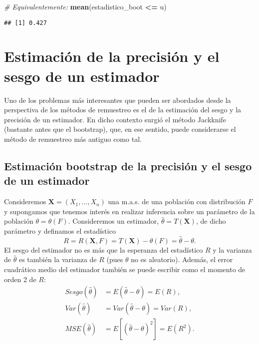 \documentclass[]{book}
\newenvironment{Shaded}{\begin{snugshade}}{\end{snugshade}}
\newcommand{\KeywordTok}[1]{\textcolor[rgb]{0.13,0.29,0.53}{\textbf{#1}}}
\newcommand{\StringTok}[1]{\textcolor[rgb]{0.31,0.60,0.02}{#1}}
\newcommand{\CommentTok}[1]{\textcolor[rgb]{0.56,0.35,0.01}{\textit{#1}}}
\newcommand{\OperatorTok}[1]{\textcolor[rgb]{0.81,0.36,0.00}{\textbf{#1}}}
\newcommand{\NormalTok}[1]{#1}
\theoremstyle{break}
\theoremstyle{definition}
\theoremstyle{definition}
\theoremstyle{definition}
\theoremstyle{remark}
\begin{document}
\begin{Shaded}
\begin{Highlighting}[]
\CommentTok{# Equivalentemente:}
\KeywordTok{mean}\NormalTok{(estadistico_boot }\OperatorTok{<=}\StringTok{ }\NormalTok{u)}
\end{Highlighting}
\end{Shaded}

\begin{verbatim}
## [1] 0.427
\end{verbatim}

\chapter{Estimación de la precisión y el sesgo de un
estimador}\label{prec-sesgo}

Uno de los problemas más interesantes que pueden ser abordados desde la
perspectiva de los métodos de remuestreo es el de la estimación del
sesgo y la precisión de un estimador. En dicho contexto surgió el método
Jackknife (bastante antes que el bootstrap), que, en ese sentido, puede
considerarse el método de remuestreo más antiguo como tal.

\section{Estimación bootstrap de la precisión y el sesgo de un
estimador}\label{prec-sesgo-boot}

Consideremos \(\mathbf{X}=\left( X_1,\ldots ,X_n \right)\) una m.a.s. de
una población con distribución \(F\) y supongamos que tenemos interés en
realizar inferencia sobre un parámetro de la población
\(\theta =\theta \left( F \right)\). Consideremos un estimador,
\(\hat{\theta}=T\left( \mathbf{X} \right)\), de dicho parámetro y
definamos el estadístico
\[R=R\left( \mathbf{X}, F \right) = T\left( \mathbf{X} \right) 
- \theta \left( F \right) = \hat{\theta} - \theta.\] El sesgo del
estimador no es más que la esperanza del estadístico \(R\) y la varianza
de \(\hat{\theta}\) es también la varianza de \(R\) (pues \(\theta\) no
es aleatorio). Además, el error cuadrático medio del estimador también
se puede escribir como el momento de orden 2 de \(R\): \[\begin{aligned}
Sesgo\left( \hat{\theta} \right) &= E\left( \hat{\theta}-\theta \right)
=E\left( R \right), \\
Var\left( \hat{\theta} \right) &= Var\left( \hat{\theta}-\theta \right)
=Var\left( R \right), \\
MSE\left( \hat{\theta} \right) &= E\left[ \left( \hat{\theta}-\theta \right)
^2\right] =E\left( R^2 \right).
\end{aligned}\]
\end{document}
